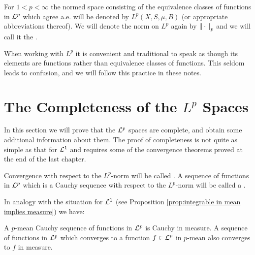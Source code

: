 \begin{definition}
For $1<p<\infty$ the normed space consisting of the equivalence classes of functions in ${\cal L}^p$ which agree a.e. will be denoted by $L^p(X,S,\mu,B)$ (or appropriate abbreviations thereof). We will denote the norm on $L^p$ again by $\norm{\,\cdot\,}_p$ and we will call it the .
\end{definition}

When working with $L^p$ it is convenient and traditional to speak as though its elements are functions rather than equivalence classes of functions. This seldom leads to confusion, and we will follow this practice in these notes.

\section{The Completeness of the \texorpdfstring{$L^p$}{Lp} Spaces}

In this section we will prove that the ${\cal L}^p$ spaces are complete, and obtain some additional information about them. The proof of completeness is not quite as simple as that for ${\cal L}^1$ and requires some of the convergence theorems proved at the end of the last chapter.

\begin{definition}
Convergence with respect to the $L^p$-norm will be called . A sequence of functions in ${\cal L}^p$ which is a Cauchy sequence with respect to the $L^p$-norm will be called a .
\end{definition}

In analogy with the situation for ${\cal L}^1$ (see Proposition \ref{prop:integrable in mean implies measure}) we have:

\begin{proposition}
\label{prop:p mean implies in measure}
A $p$-mean Cauchy sequence of functions in ${\cal L}^p$ is Cauchy in measure. A sequence of functions in ${\cal L}^p$ which converges to a function $f\in{\cal L}^p$ in $p$-mean also converges to $f$ in measure.
\end{proposition}

